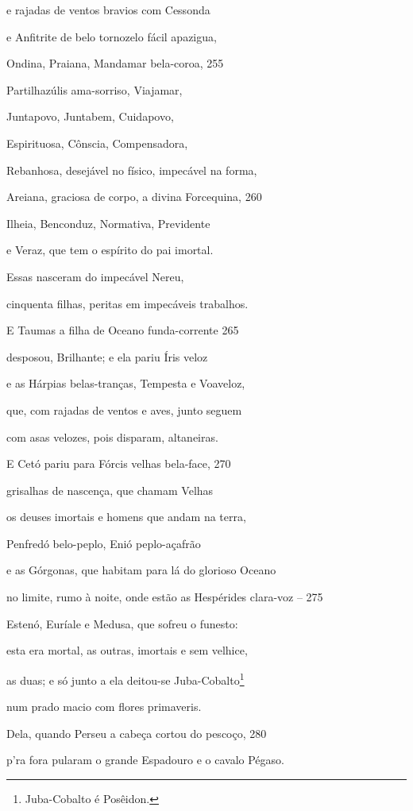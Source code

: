 e rajadas de ventos bravios com Cessonda

e Anfitrite de belo tornozelo fácil apazigua,

Ondina, Praiana, Mandamar bela-coroa, \num{255}

Partilhazúlis ama-sorriso, Viajamar,

Juntapovo, Juntabem, Cuidapovo,

Espirituosa, Cônscia, Compensadora,

Rebanhosa, desejável no físico, impecável na forma,

Areiana, graciosa de corpo, a divina Forcequina, \num{260}

Ilheia, Benconduz, Normativa, Previdente

e Veraz, que tem o espírito do pai imortal.

Essas nasceram do impecável Nereu,

cinquenta filhas, peritas em impecáveis trabalhos.

\quad{}E Taumas a filha de Oceano funda-corrente \num{265}

desposou, Brilhante; e ela pariu Íris veloz

e as Hárpias belas-tranças, Tempesta e Voaveloz,

que, com rajadas de ventos e aves, junto seguem

com asas velozes, pois disparam, altaneiras.

\medskip

E Cetó pariu para Fórcis velhas bela-face, \num{270}

grisalhas de nascença, que chamam Velhas

os deuses imortais e homens que andam na terra,

Penfredó belo-peplo, Enió peplo-açafrão

e as Górgonas, que habitam para lá do glorioso Oceano

no limite, rumo à noite, onde estão as Hespérides \qb{}clara-voz -- \num{275}

Estenó, Euríale e Medusa, que sofreu o funesto:

esta era mortal, as outras, imortais e sem velhice,

as duas; e só junto a ela deitou-se Juba-Cobalto\footnote{Juba-Cobalto é Posêidon.}

num prado macio com flores primaveris.

Dela, quando Perseu a cabeça cortou do pescoço, \num{280}

p'ra fora pularam o grande Espadouro e o cavalo Pégaso.

